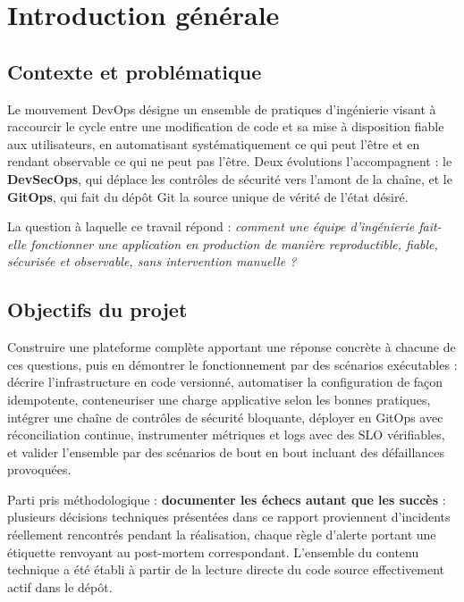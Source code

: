 \documentclass[12pt,a4paper,oneside]{report}
\makeatletter
\def\cleardoublepage{\clearpage\if@twoside
  \ifodd\c@page\else\hbox{}\thispagestyle{empty}\newpage\fi\fi}
\makeatother
\begin{document}
\cleardoublepage
{}

\chapter*{Introduction générale}

\section*{Contexte et problématique}

Le mouvement DevOps désigne un ensemble de pratiques d'ingénierie visant à raccourcir le cycle entre une modification de code et sa mise à disposition fiable aux utilisateurs, en automatisant systématiquement ce qui peut l'être et en rendant observable ce qui ne peut pas l'être. Deux évolutions l'accompagnent : le \textbf{DevSecOps}, qui déplace les contrôles de sécurité vers l'amont de la chaîne, et le \textbf{GitOps}, qui fait du dépôt Git la source unique de vérité de l'état désiré.

La question à laquelle ce travail répond : \emph{comment une équipe d'ingénierie fait-elle fonctionner une application en production de manière reproductible, fiable, sécurisée et observable, sans intervention manuelle ?}

\section*{Objectifs du projet}

Construire une plateforme complète apportant une réponse concrète à chacune de ces questions, puis en démontrer le fonctionnement par des scénarios exécutables : décrire l'infrastructure en code versionné, automatiser la configuration de façon idempotente, conteneuriser une charge applicative selon les bonnes pratiques, intégrer une chaîne de contrôles de sécurité bloquante, déployer en GitOps avec réconciliation continue, instrumenter métriques et logs avec des SLO vérifiables, et valider l'ensemble par des scénarios de bout en bout incluant des défaillances provoquées.

Parti pris méthodologique : \textbf{documenter les échecs autant que les succès} : plusieurs décisions techniques présentées dans ce rapport proviennent d'incidents réellement rencontrés pendant la réalisation, chaque règle d'alerte portant une étiquette renvoyant au post-mortem correspondant. L'ensemble du contenu technique a été établi à partir de la lecture directe du code source effectivement actif dans le dépôt.
\end{document}
